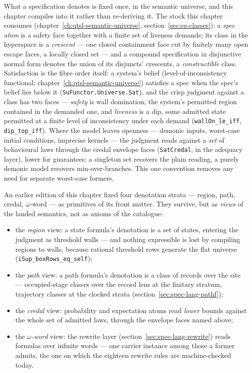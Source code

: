 What a specification denotes is fixed once, in the semantic universe,
and this chapter compiles into it rather than re-deriving it. The
stock this chapter consumes
(chapter~\ref{ch:qtsl-semantic-universe}, section~\ref{sec:su-classes}):
a \emph{spec atom} is a safety face together with a finite set of
liveness demands; its class in the hyperspace is a \emph{crescent} ---
one closed containment face cut by finitely many open escape faces, a
locally closed set --- and a compound specification in disjunctive
normal form denotes the union of its disjuncts' crescents, a
\emph{constructible} class. Satisfaction is the fibre order itself:
a system's belief (level-of-inconsistency functional;
chapter~\ref{ch:qtsl-semantic-universe}) satisfies a spec when the
spec's belief lies
below it (\texttt{SuFunctor.Universe.Sat}), and the crisp judgment
against a class has two faces --- \emph{safety} is wall domination,
the system's permitted region contained in the demanded one, and
\emph{liveness} is a dip, some admitted state permitted at a finite
level of inconsistency under each demand (\texttt{wallOn\_le\_iff},
\texttt{dip\_top\_iff}). Where the model leaves openness --- demonic
inputs, worst-case initial conditions, imprecise kernels --- the
judgment reads against a \emph{set} of behavioural laws through the
credal envelope faces (\texttt{SatCredal},
in the adequacy layer), lower for guarantees; a singleton set
recovers the plain reading, a purely demonic model recovers
min-over-branches. This one convention removes any need for
separate worst-case formers.

An earlier edition of this chapter fixed four denotation strata ---
region, path, credal, $\omega$-word --- as primitives of its front
matter. They survive, but as \emph{views} of the landed semantics,
not as axioms of the catalogue:

\begin{itemize}
\item the \emph{region} view: a state formula's denotation is a set
  of states, entering the judgment as threshold walls --- and nothing
  expressible is lost by compiling regions to walls, because rational
  threshold rows generate the flat universe
  (\texttt{iSup\_boxRows\_eq\_self});
\item the \emph{path} view: a path formula's denotation is a class of
  records over the site --- occupied-stage classes over the record
  lens at the finitary stratum, trajectory classes at the clocked
  strata (section~\ref{sec:spec-lang-pathf});
\item the \emph{credal} view: probability and expectation atoms read
  \emph{lower} bounds against the whole set of admitted laws, through
  the envelope faces named above;
\item the \emph{$\omega$-word} view: the rewrite layer
  (section~\ref{sec:spec-lang-rewrite}) reads formulas over infinite
  words --- one carrier instance among those a former admits, the one
  on which the eighteen rewrite rules are machine-checked today.
\end{itemize}

